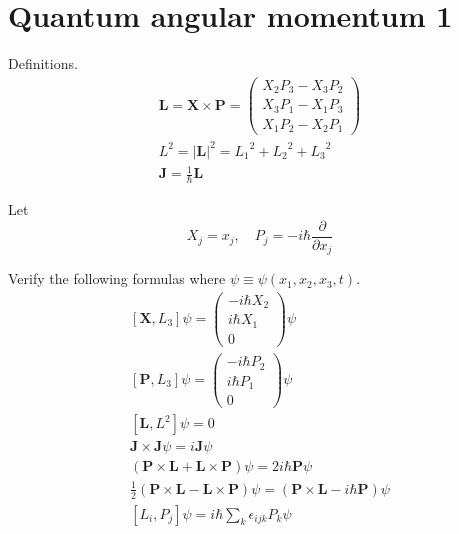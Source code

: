 

\section*{Quantum angular momentum 1}

Definitions.
\begin{gather*}
\mathbf L=\mathbf X\times\mathbf P
=\begin{pmatrix}
X_2P_3-X_3P_2
\\
X_3P_1-X_1P_3
\\
X_1P_2-X_2P_1
\end{pmatrix}
\\[1ex]
L^2=|\mathbf L|^2={L_1}^2+{L_2}^2+{L_3}^2
\\[1ex]
\mathbf J=\frac{1}{\hbar}\mathbf L
\end{gather*}

Let
\begin{equation*}
X_j=x_j,\quad P_j=-i\hbar\frac{\partial}{\partial x_j}
\end{equation*}

Verify the following formulas where $\psi\equiv\psi(x_1,x_2,x_3,t)$.
\begin{gather*}
%
[\mathbf X,L_3]\psi
=\begin{pmatrix}
-i\hbar X_2
\\
i\hbar X_1
\\
0
\end{pmatrix}\psi
\tag{1}
\\[1ex]
%
[\mathbf P,L_3]\psi
=\begin{pmatrix}
-i\hbar P_2
\\
i\hbar P_1
\\
0
\end{pmatrix}\psi
\tag{2}
\\[1ex]
%
[\mathbf L,L^2]\psi=0
\tag{3}
\\[1ex]
%
\mathbf J\times\mathbf J\psi=i\mathbf J\psi
\tag{4}
\\[1ex]
%
(\mathbf P\times\mathbf L+\mathbf L\times\mathbf P)\psi=2i\hbar\mathbf P\psi
\tag{5}
\\[1ex]
%
\tfrac{1}{2}(\mathbf P\times\mathbf L-\mathbf L\times\mathbf P)\psi
=(\mathbf P\times\mathbf L-i\hbar\mathbf P)\psi
\tag{6}
\\[1ex]
%
[L_i,P_j]\psi=i\hbar\sum_k\epsilon_{ijk}P_k\psi
\tag{7}
\end{gather*}



